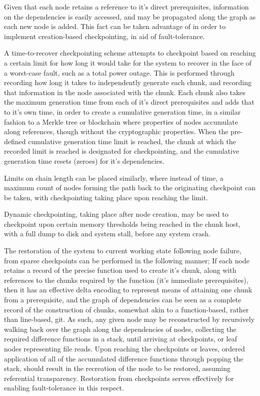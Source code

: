 \documentclass[10pt, a4paper]{article}
\begin{document}
Given that each node retains a reference to it's direct prerequisites, information on the dependencies is easily accessed, and may be propagated along the graph as each new node is added.
This fact can be taken advantage of in order to implement creation-based checkpointing, in aid of fault-tolerance.

A time-to-recover checkpointing scheme attempts to checkpoint based on reaching a certain limit for how long it would take for the system to recover in the face of a worst-case fault, such as a total power outage.
This is performed through recording how long it takes to independently generate each chunk, and recording that information in the node associated with the chunk.
Each chunk also takes the maximum generation time from each of it's direct prerequisites and adds that to it's own time, in order to create a cumulative generation time, in a similar fashion to a Merkle tree or blockchain where properties of nodes accumulate along references, though without the cryptographic properties.
When the pre-defined cumulative generation time limit is reached, the chunk at which the recorded limit is reached is designated for checkpointing, and the cumulative generation time resets (zeroes) for it's dependencies.

Limits on chain length can be placed similarly, where instead of time, a maximum count of nodes forming the path back to the originating checkpoint can be taken, with checkpointing taking place upon reaching the limit.

Dynamic checkpointing, taking place after node creation, may be used to checkpoint upon certain memory thresholds being reached in the chunk host, with a full dump to disk and system stall, before any system crash.

The restoration of the system to current working state following node failure, from sparse checkpoints can be performed in the following manner;
If each node retains a record of the precise function used to create it's chunk, along with references to the chunks required by the function (it's immediate prerequisites), then it has an effective delta encoding to represent means of attaining one chunk from a prerequisite, and the graph of dependencies can be seen as a complete record of the construction of chunks, somewhat akin to a function-based, rather than line-based, git.
As such, any given node may be reconstructed by recursively walking back over the graph along the dependencies of nodes, collecting the required difference functions in a stack, until arriving at checkpoints, or leaf nodes representing file reads.
Upon reaching the checkpoints or leaves, ordered application of all of the accumulated difference functions through popping the stack, should result in the recreation of the node to be restored, assuming referential transparency.
Restoration from checkpoints serves effectively for enabling fault-tolerance in this respect.
\end{document}

